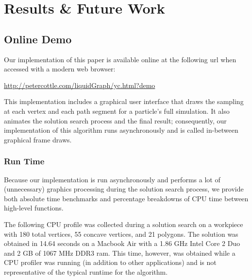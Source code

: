           \chapter{Results \& Future Work}



\newpage

\section{Online Demo}

Our implementation of this paper is available online at the following url when accessed with a modern web browser:

\vspace{0.2in}

\begin{centering}
\url{http://petercottle.com/liquidGraph/yc.html?demo}
\end{centering}

\vspace{0.2in}

This implementation includes a graphical user interface that draws the sampling at each vertex and each path segment for a particle's full simulation. It also animates the solution search process and the final result; consequently, our implementation of this algorithm runs asynchronously and is called in-between graphical frame draws.

  \subsection{Run Time}

Because our implementation is run asynchronously and performs a lot of (unnecessary) graphics processing during the solution search process, we provide both absolute time benchmarks and percentage breakdowns of CPU time between high-level functions.

The following CPU profile was collected during a solution search on a workpiece with 180 total vertices, 55 concave vertices, and 21 polygons. The solution was obtained in 14.64 seconds on a Macbook Air with a 1.86 GHz Intel Core 2 Duo and 2 GB of 1067 MHz DDR3 ram. This time, however, was obtained while a CPU profiler was running (in addition to other applications) and is not representative of the typical runtime for the algorithm.

